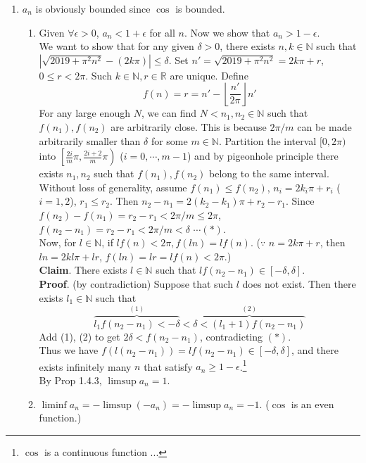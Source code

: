 \documentclass[12pt]{report}
\newcommand{\bb}[1]{\mathbb{#1}}
\newcommand{\abs}[1]{\left|#1\right|}
\begin{document}
\begin{enumerate}
\begin{enumerate}
	\item $a_n$ is obviously bounded since $\cos$ is bounded.
	\begin{enumerate}
		\item Given $\forall \epsilon > 0$, $a_n < 1+\epsilon$ for all $n$. Now we show that $a_n > 1-\epsilon$.\\
		We want to show that for any given $\delta > 0$, there exists $n, k\in \bb{N}$ such that $\abs{\sqrt{2019+\pi^2n^2} - (2k\pi)} \leq \delta$.
		Set $n' = \sqrt{2019+\pi^2n^2} = 2k\pi + r$, $0\leq r < 2\pi$. Such $k\in \bb{N}, r\in\bb{R}$ are unique.
		Define $$f(n) = r = n' - \left \lfloor\frac{n'}{2\pi}\right \rfloor n'$$For any large enough $N$, we can find $N < n_1, n_2\in\bb{N}$ such that $f(n_1), f(n_2)$ are arbitrarily close. This is because $2\pi/m$ can be made arbitrarily smaller than $\delta$ for some $m\in \bb{N}$. Partition the interval $[0, 2\pi)$ into $\left [\frac{2i}{m}\pi, \frac{2i+2}{m}\pi\right )$ ($i=0, \cdots, m-1$) and by pigeonhole principle there exists $n_1, n_2$ such that $f(n_1), f(n_2)$ belong to the same interval.\\
		Without loss of generality, assume $f(n_1)\leq f(n_2)$, $n_i = 2k_i\pi + r_i$ ($i=1, 2$), $r_1\leq r_2$. Then $n_2-n_1 = 2(k_2-k_1)\pi + r_2-r_1$. Since $f(n_2)-f(n_1) = r_2 - r_1 < 2\pi/m \leq 2\pi$, $f(n_2-n_1) = r_2-r_1 < 2\pi/m < \delta$ $\cdots (*)$.\\Now, for $l\in \bb{N}$, if $lf(n) < 2\pi, f(ln)= lf(n)$. ($\because$ $n = 2k\pi + r$, then $ln = 2kl\pi+lr$, $f(ln) = lr = lf(n) < 2\pi$.)\\
		\textbf{Claim}. There exists $l\in\bb{N}$ such that $lf(n_2-n_1) \in \left[- \delta, \delta \right]$.\\
		\textbf{Proof}. (by contradiction) Suppose that such $l$ does not exist. Then there exists $l_1\in \bb{N}$ such that $$\overset{(1)}{\overbrace{l_1f(n_2-n_1) < -\delta}}<\overset{(2)}{\overbrace{\delta < (l_1+1)f(n_2-n_1)}}$$
		Add (1), (2) to get $2\delta < f(n_2-n_1)$, contradicting $(*)$.\\
		Thus we have $f(l(n_2-n_1)) = lf(n_2-n_1) \in \left[-\delta, \delta\right]$, and there exists infinitely many $n$ that satisfy $a_n\geq 1-\epsilon$.\footnote{$\cos$ is a continuous function ...}
		\\By \textsf{Prop 1.4.3}, $\limsup a_n = 1$.

		\item $\liminf a_n = -\limsup (-a_n) = -\limsup a_n = -1$. ($\cos$ is an even function.)
	\end{enumerate}
\end{enumerate}


\end{enumerate}
\end{document}
